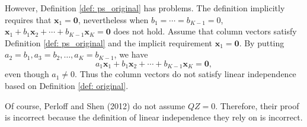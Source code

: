 \documentclass[11pt, a4paper]{article}
\begin{document}
However, Definition \ref{def: ps_original} has problems.
The definition implicitly requires that $\bm{x}_1 = \bm{0}$, nevertheless when $b_1 = \cdots = b_{K-1}= 0$, $\bm{x}_1 + b_1 \bm{x}_2 + \cdots + b_{K-1} \bm{x}_K = \bm{0} $ does not hold.
Assume that column vectors satisfy Definition \ref{def: ps_original} and the implicit requirement $\bm{x}_1 = \bm{0}$.
By putting $a_2 = b_1, a_3 = b_2,\ldots, a_K = b_{K-1}$, we have 
\[a_1 \bm{x}_1 + b_1 \bm{x}_2 + \cdots + b_{K-1} \bm{x}_K = \bm{0},\]
even though $a_1 \ne 0$.
Thus the column vectors do not satisfy linear independence based on Definition \ref{def: original}.

Of course, Perloff and Shen (2012) do not assume $QZ =0$. 
Therefore, their proof is incorrect because the definition of linear independence they rely on is incorrect.

\newpage
\end{document}
